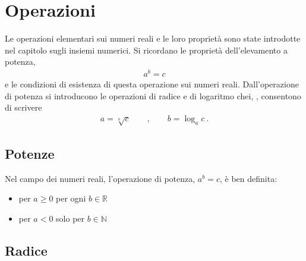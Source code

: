 \documentclass[letterpaper,10pt,italian]{jupyterBook}
\begin{document}
\section{Operazioni}
\label{\detokenize{ch/algebra/real-algebra:operazioni}}
\sphinxAtStartPar
Le operazioni elementari sui numeri reali e le loro proprietà sono state introdotte nel capitolo sugli insiemi numerici. Si ricordano le proprietà dell’elevamento a potenza,
\begin{equation*}
\begin{split}a^b = c\end{split}
\end{equation*}
\sphinxAtStartPar
e le condizioni di esistenza di questa operazione sui numeri reali. Dall’operazione di potenza si introducono le operazioni di radice e di logaritmo chei, , consentono di scrivere
\begin{equation*}
\begin{split}a = \sqrt[b]{c} \qquad , \qquad b = \log_{a} c \ .\end{split}
\end{equation*}

\subsection{Potenze}
\label{\detokenize{ch/algebra/real-algebra:potenze}}
\sphinxAtStartPar
Nel campo dei numeri reali, l’operazione di potenza, \(a^b = c\), è ben definita:
\begin{itemize}
\item {} 
\sphinxAtStartPar
per \(a \ge 0\) per ogni \(b \in \mathbb{R}\)

\item {} 
\sphinxAtStartPar
per \(a < 0\) solo per \(b \in \mathbb{N}\)

\end{itemize}

\sphinxAtStartPar
{} 


\subsection{Radice}
\label{\detokenize{ch/algebra/real-algebra:radice}}
\sphinxAtStartPar
{}

\sphinxAtStartPar
{}
\end{document}
